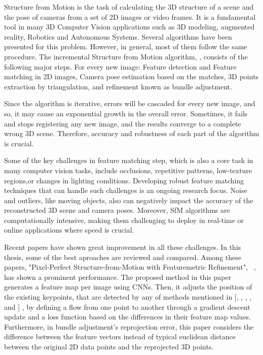 \documentclass[11pt]{article}
\begin{document}
    Structure from Motion is the task of calculating the 3D structure of a scene and the pose of cameras from
    a set of 2D images or video frames.
    It is a fundamental tool in many 3D Computer Vision applications such as 3D modeling, augmented reality,
    Robotics and Autonomous Systems.
    Several algorithms have been presented for this problem. However, in general, most of them follow the same procedure.
    The incremental Structure from Motion algorithm, \cite{schoenberger2016sfm}, consists of the following major steps.
    For every new image:
    Feature detection and Feature matching in 2D images,
    Camera pose estimation based on the matches,
    3D points extraction by triangulation,
    and refinement known as bundle adjustment.

    Since the algorithm is iterative, errors will be cascaded for every new image, and so, it may
    cause an exponential growth in the overall error. Sometimes, it fails and stops registering any new image,
    and the results converge to a complete wrong 3D scene. Therefore, accuracy and robustness of each part of
    the algorithm is crucial.

    Some of the key challenges in feature matching step, which is also a core task in many computer vision tasks,
    include occlusions, repetitive patterns, low-texture regions,or changes in lighting conditions.
    Developing robust feature matching techniques that can handle such challenges is an ongoing research focus.
    Noise and outliers, like moving objects, also can negatively impact the accuracy
    of the reconstructed 3D scene and camera poses. Moreover, SfM algorithms are computationally intensive,
    making them challenging to deploy in real-time or online applications where speed is crucial.

    Recent papers have shown great improvement in all these challenges. In this thesis, some of the best aproaches are
    reviewed and compared. Among these papers, "Pixel-Perfect Structure-from-Motion with Featuremetric Refinement",
    ~\cite{lindenberger2021pixsfm}, has shown a prominent performance. The proposed method in this paper generates a feature map per image using CNNs.
    Then, it adjusts the position of the existing keypoints, that are detected by any of methods mentioned in
    [\cite{wang2020displacement}, \cite{revaud2019r2d2}, \cite{detone2018superpoint}, \cite{dusmanu2019d2net}, and \cite{detone2018superpoint}]
    , by defining a flow from one point to another through a gradient descent update and a loss function based
    on the differences in their feature map values.
    Furthermore, in bundle adjustment's reprojection error, this paper considers the difference between the
    feature vectors instead of typical euclidean distance between the original 2D data points and the reprojected 3D points.
\end{document}
